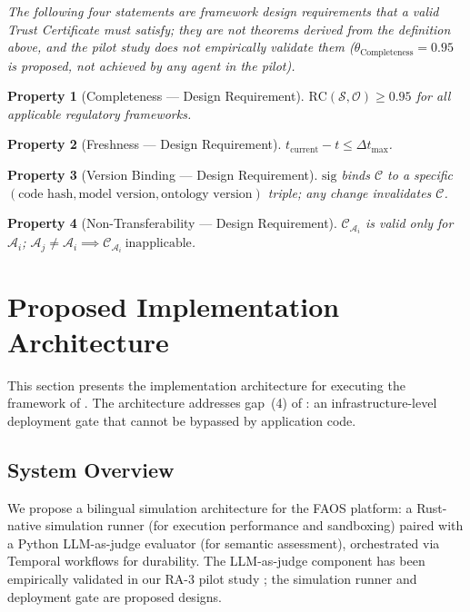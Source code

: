 \documentclass[11pt,a4paper]{article}
\newtheorem{property}{Property}[section]
\newcommand{\faos}{\textsc{FAOS}}
\newcommand{\agent}{\mathcal{A}}
\newcommand{\scenario}{\mathcal{S}}
\newcommand{\onto}{\mathcal{O}}
\newcommand{\cert}{\mathcal{C}}
\begin{document}
\emph{The following four statements are framework design requirements that a valid Trust Certificate must satisfy; they are not theorems derived from the definition above, and the pilot study does not empirically validate them ($\theta_{\text{Completeness}}{=}0.95$ is proposed, not achieved by any agent in the pilot).}

\begin{property}[Completeness --- Design Requirement]
  $\text{RC}(\scenario, \onto) \geq 0.95$ for all applicable regulatory frameworks.
\end{property}

\begin{property}[Freshness --- Design Requirement]
  $t_{\text{current}} - t \leq \Delta t_{\text{max}}$.
\end{property}

\begin{property}[Version Binding --- Design Requirement]
  $\text{sig}$ binds $\cert$ to a specific $(\text{code hash}, \text{model version}, \text{ontology version})$ triple; any change invalidates $\cert$.
\end{property}

\begin{property}[Non-Transferability --- Design Requirement]
  $\cert_{\agent_i}$ is valid only for $\agent_i$; $\agent_j \neq \agent_i \implies \cert_{\agent_i}\ \text{inapplicable}$.
\end{property}

\section{Proposed Implementation Architecture}
\label{sec:simulation-architecture}

This section presents the implementation architecture for executing
the framework of . The architecture
addresses gap~(4) of : an infrastructure-level
deployment gate that cannot be bypassed by application code.

\subsection{System Overview}

We propose a bilingual simulation architecture for the \faos{}
platform: a Rust-native simulation runner (for execution performance
and sandboxing) paired with a Python LLM-as-judge evaluator (for
semantic assessment), orchestrated via Temporal workflows for
durability. The LLM-as-judge component has been empirically validated
in our RA-3 pilot study \citep{luong2026neurosymbolic}; the
simulation runner and deployment gate are proposed designs.
\end{document}
